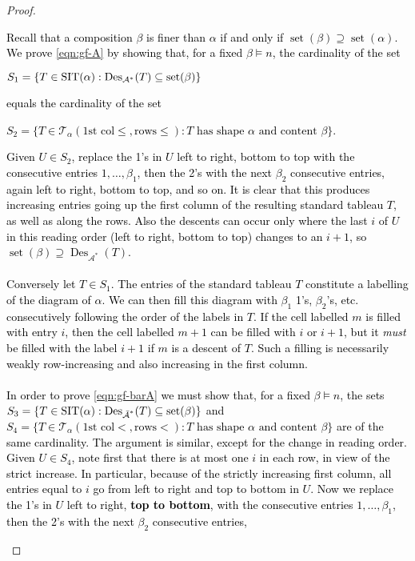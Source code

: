 \documentclass[12pt,letterpaper]{amsart}
\newcommand{\sheilaFeb}{\textcolor{black}}  \newcommand{\sheilaFebAgain}{\textcolor{magenta}}  \newcommand{\emn}{\textcolor{blue}}
\theoremstyle{definition}
\DeclareMathOperator{\set}{set}
\DeclareMathOperator{\Des}{Des}
\begin{document}
\begin{proof} 
\sheilaFeb{Recall that a composition $\beta$ is finer than $\alpha$ if and only if $\set(\beta)\supseteq\set(\alpha).$ 
 We prove  \eqref{eqn:gf-A} by showing that, for a fixed $\beta\vDash n$, the cardinality of the set 
\begin{center}$S_1=\{T\in \SIT(\alpha):\Des_{{\mathcal A}^*}(T)\subseteq \set(\beta)\}$\end{center}
equals the cardinality of the set 
\begin{center}$S_2=\{T\in \mathcal{T}_\alpha({\text{1st col}\le, \text{rows}\le})   : T \text{ has shape }\alpha \text{ and content } \beta\}$.\end{center} 
Given $U\in S_2$, replace the 1's in $U$ left to right, bottom to top with the consecutive entries $1,\ldots,\beta_1$, then the 2's with the next $\beta_2$ consecutive entries, 
again left to right, bottom to top, and so on.  It is clear that this produces increasing entries going up the first column of the resulting standard tableau $T$, as well as along the rows.  Also the descents can occur only where  the last $i$ of $U$ in this reading order (left to right, bottom to top) changes to an $i+1$, so 
$\set(\beta)\supseteq \Des_{{\mathcal A}^*}(T)$.
\\
\\
Conversely let $T\in S_1.$ The entries of the standard tableau $T$ constitute a labelling of the diagram of $\alpha$.  
We can then fill this diagram  with $\beta_1$ 1's,  $\beta_2$'s, etc. consecutively following the order of the labels in $T$.   
If the cell labelled $m$ is filled with entry $i$, then the cell labelled $m+1$ can be filled with $i$ or $i+1$, but it \emph{must} be filled with the label $i+1$ if $m$ is a descent of $T$. Such a filling is necessarily weakly row-increasing and also increasing in the first column.
\\
\\
In order to prove  \eqref{eqn:gf-barA} we must show that, for a fixed $\beta\vDash n$, the sets 
$S_3=\{T\in \SIT(\alpha):\Des_{{\bA}^*}(T)\subseteq \set(\beta)\}$
and 
$S_4=\{T\in \mathcal{T}_\alpha({\text{1st col}<, \text{rows}<})   : T \text{ has shape }\alpha \text{ and content } \beta\}$ are of the same cardinality.
The argument is similar,  except for the change in reading order.  Given $U\in S_4$, note first that there is at most one $i$ in each row, in view of the strict increase.  In particular, because of the strictly increasing first column, all entries equal to $i$ go from left to right  and top to bottom in $U$.  Now we replace the 1's in $U$ left to right, \textbf{top to bottom}, with the consecutive entries $1,\ldots,\beta_1$, then the 2's with the next $\beta_2$ consecutive entries, 
}
\end{proof}
\end{document}
